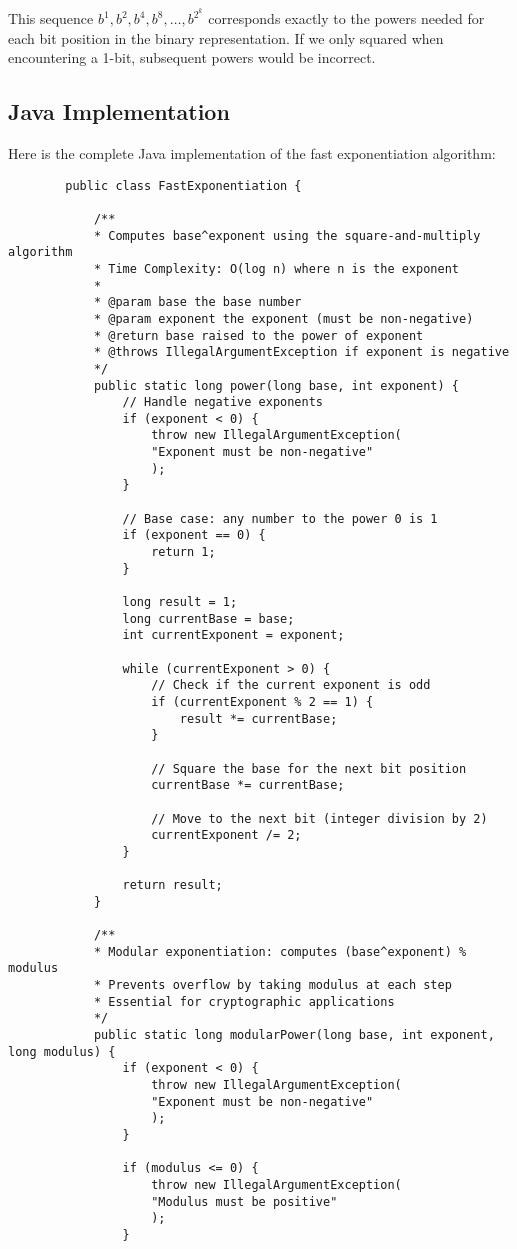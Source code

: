 \documentclass{article}
\begin{document}
	This sequence $b^1, b^2, b^4, b^8, \ldots, b^{2^k}$ corresponds exactly to the powers needed for each bit position in the binary representation. If we only squared when encountering a 1-bit, subsequent powers would be incorrect.
	
	\subsection{Java Implementation}
	
	Here is the complete Java implementation of the fast exponentiation algorithm:
	
	\begin{lstlisting}
		public class FastExponentiation {
			
			/**
			* Computes base^exponent using the square-and-multiply algorithm
			* Time Complexity: O(log n) where n is the exponent
			* 
			* @param base the base number
			* @param exponent the exponent (must be non-negative)
			* @return base raised to the power of exponent
			* @throws IllegalArgumentException if exponent is negative
			*/
			public static long power(long base, int exponent) {
				// Handle negative exponents
				if (exponent < 0) {
					throw new IllegalArgumentException(
					"Exponent must be non-negative"
					);
				}
				
				// Base case: any number to the power 0 is 1
				if (exponent == 0) {
					return 1;
				}
				
				long result = 1;
				long currentBase = base;
				int currentExponent = exponent;
				
				while (currentExponent > 0) {
					// Check if the current exponent is odd
					if (currentExponent % 2 == 1) {
						result *= currentBase;
					}
					
					// Square the base for the next bit position
					currentBase *= currentBase;
					
					// Move to the next bit (integer division by 2)
					currentExponent /= 2;
				}
				
				return result;
			}
			
			/**
			* Modular exponentiation: computes (base^exponent) % modulus
			* Prevents overflow by taking modulus at each step
			* Essential for cryptographic applications
			*/
			public static long modularPower(long base, int exponent, long modulus) {
				if (exponent < 0) {
					throw new IllegalArgumentException(
					"Exponent must be non-negative"
					);
				}
				
				if (modulus <= 0) {
					throw new IllegalArgumentException(
					"Modulus must be positive"
					);
				}
				

\end{lstlisting}
\end{document}
